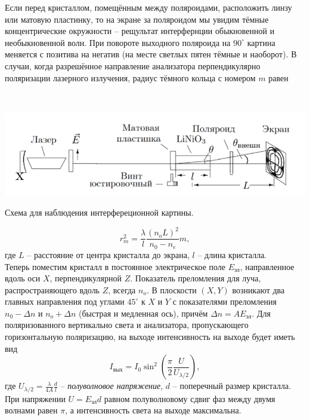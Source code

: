 \begin{minipage}{0.47\textwidth}
Если перед кристаллом, помещённым между поляроидами, расположить линзу или матовую пластинку, то на экране за поляроидом мы увидим тёмные концентрические окружности -- рещультат интерфернции обыкновенной и необыкновенной волн. При повороте выходного поляроида на $90^\circ$ картина меняется с позитива на негатив (на месте светлых пятен тёмные и наоборот). В случаи, когда разрешённое направление анализатора перпендикулярно поляризации лазерного излучения, радиус тёмного кольца с номером $m$ равен
\end{minipage}
\begin{minipage}{0.05\textwidth}
\
\end{minipage}
\begin{minipage}{0.47\textwidth}
\begin{center}
\includegraphics[width = \textwidth]{1.png}
\end{center}
\vspace{-40ptx}
\begin{center}
Схема для наблюдения интерфереционной картины.
\end{center}
\end{minipage}
\begin{equation}
r_m^2 = \dfrac{\lambda}{l} \dfrac{(n_oL)^2}{n_0 - n_e}m,
\end{equation}
где $L$ -- расстояние от центра кристалла до экрана, $l$ -- длина кристалла.\\
Теперь поместим кристалл в постоянное электрическое поле $E_{\text{эл}}$, направленное вдоль оси $X$, перпендикулярной $Z$. Показатель преломления для луча, распространяющего вдоль $Z$, всегда $n_o$. В плоскости $(X,Y)$ возникают два главных направления под углами $45^\circ$ к $X$ и $Y$ с показателями преломления $n_0 - \Delta n$ и $n_o + \Delta n$ (быстрая и медленная ось), причём $\Delta n = A E_{\text{эл}}$. Для поляризованного вертикально света и анализатора, пропускающего горизонтальную поляризацию, на выходе интенсивность на выходе будет иметь вид
\begin{equation}
I_{\text{вых}} = I_0 \sin^2 \left(\dfrac{\pi}{2} \dfrac{U}{U_{\lambda/2}} \right),
\end{equation}
где $U_{\lambda/2} = \frac{\lambda}{4A}\frac{d}{l}$ -- \textit{полуволновое напряжение}, $d$ -- поперечный размер кристалла.  При напряжении $U = E_{\text{эл}}d$ равном полуволновому сдвиг фаз между двумя волнами равен $\pi$, а интенсивность света на выходе максимальна. 


